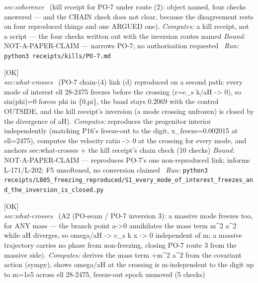 \begin{description}
\textit{sec:coherence} \ (kill receipt for PO-7 under route (2): object named, four checks answered --- and the CHAIN check does not clear, because the disagreement rests on four reproduced things and one ARGUED one). 
\emph{Computes:} a kill receipt, not a script --- the four checks written out with the inversion routes named
 \emph{Bound:} NOT-A-PAPER-CLAIM --- narrows PO-7; no authorisation requested
\ \emph{Run:} \texttt{python3 receipts/kills/PO-7.md}
\item[\label{rcpt:S1_every_mode_of_interest_freezes_and_the_inversion_is_closed}\textbf{}\quad\texttt{S1\_every\_mode\_of\_interest\_freezes\_and\_the\_inversion\_is\_closed}]\hfill\textsf{[OK]}\\
\textit{sec:what-crosses} \ (PO-7 chain-(4) link (d) reproduced on a second path: every mode of interest ell 28-2475 freezes before the crossing (r=c\_s k/\textbar{}aH\textbar{} -> 0), so sin(phi)=0 forces phi in \{0,pi\}, the band stays 0.2069 with the control OUTSIDE, and the kill receipt's inversion (a mode crossing unfrozen) is closed by the divergence of \textbar{}aH\textbar{}). 
\emph{Computes:} reproduces the progenitor interior independently (matching P16's freeze-out to the digit, x\_freeze=0.002015 at ell=2475), computes the velocity ratio -> 0 at the crossing for every mode, and anchors sec:what-crosses + the kill receipt's chain check (10 checks)
 \emph{Bound:} NOT-A-PAPER-CLAIM --- reproduces PO-7's one non-reproduced link; informs L-171/L-202; F5 unsoftened, no conversion claimed
\ \emph{Run:} \texttt{python3 receipts/L805\_freezing\_reproduced/S1\_every\_mode\_of\_interest\_freezes\_and\_the\_inversion\_is\_closed.py}
\item[\label{rcpt:S1_a_massive_mode_freezes_too_and_the_mass_term_vanishes_at_the_branch_point}\textbf{}\quad\texttt{S1\_a\_massive\_mode\_freezes\_too\_and\_the\_mass\_term\_vanishes\_at\_the\_branch\_point}]\hfill\textsf{[OK]}\\
\textit{sec:what-crosses} \ (A2 (PO-seam / PO-7 inversion 3): a massive mode freezes too, for ANY mass --- the branch point a->0 annihilates the mass term m\textasciicircum{}2 a\textasciicircum{}2 while \textbar{}aH\textbar{} diverges, so omega/\textbar{}aH\textbar{} -> c\_s k x -> 0 independent of m; a massive trajectory carries no phase from non-freezing, closing PO-7 route 3 from the massive side). 
\emph{Computes:} derives the mass term +m\textasciicircum{}2 a\textasciicircum{}2 from the covariant action (sympy), shows omega/\textbar{}aH\textbar{} at the crossing is m-independent to the digit up to m=1e5 across ell 28-2475, freeze-out epoch unmoved (5 checks)

\end{description}
